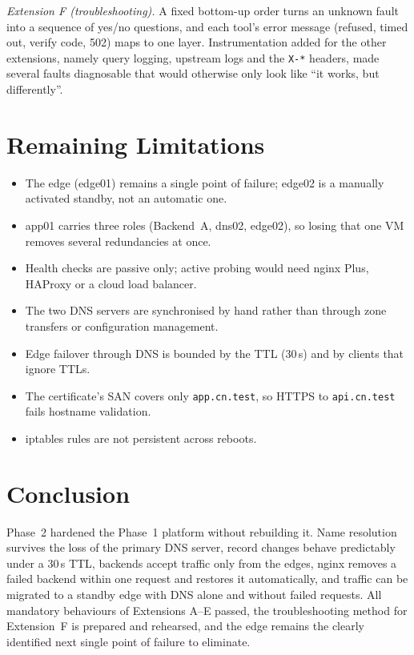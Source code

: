 \documentclass[conference,a4paper]{IEEEtran}
\newcommand{\cmd}[1]{\texttt{\small #1}}
\begin{document}
\emph{Extension F (troubleshooting).} A fixed bottom-up order turns an unknown fault into a sequence of yes/no
questions, and each tool's error message (refused, timed out, verify code, 502) maps to one layer. Instrumentation
added for the other extensions, namely query logging, upstream logs and the \cmd{X-*} headers, made several faults
diagnosable that would otherwise only look like ``it works, but differently''.

\section{Remaining Limitations}\label{sec:limits}
\begin{itemize}
\item The edge (edge01) remains a single point of failure; edge02 is a manually activated standby, not an automatic one.
\item app01 carries three roles (Backend~A, dns02, edge02), so losing that one VM removes several redundancies at once.
\item Health checks are passive only; active probing would need nginx Plus, HAProxy or a cloud load balancer.
\item The two DNS servers are synchronised by hand rather than through zone transfers or configuration management.
\item Edge failover through DNS is bounded by the TTL (30\,s) and by clients that ignore TTLs.
\item The certificate's SAN covers only \cmd{app.cn.test}, so HTTPS to \cmd{api.cn.test} fails hostname validation.
\item iptables rules are not persistent across reboots.
\end{itemize}

\section{Conclusion}
Phase~2 hardened the Phase~1 platform without rebuilding it. Name resolution survives the loss of the primary DNS
server, record changes behave predictably under a 30\,s TTL, backends accept traffic only from the edges, nginx removes
a failed backend within one request and restores it automatically, and traffic can be migrated to a standby edge with
DNS alone and without failed requests. All mandatory behaviours of Extensions A--E passed, the troubleshooting method
for Extension~F is prepared and rehearsed, and the edge remains the clearly identified next single point of failure
to eliminate.
\end{document}
